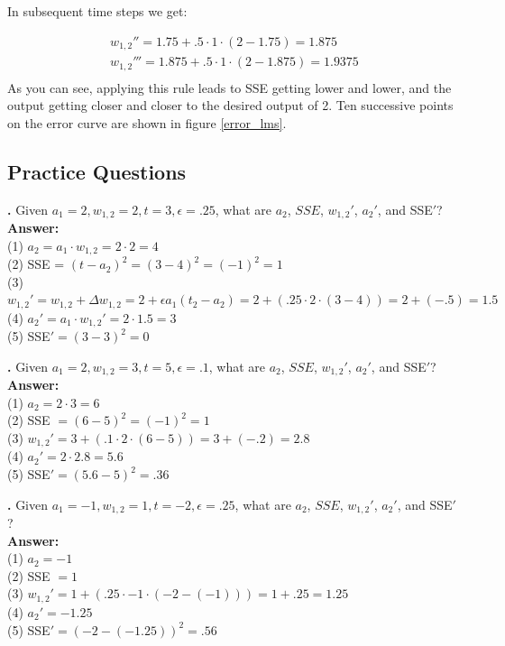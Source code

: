 In subsequent time steps we get:

\begin{eqnarray*}
w_{1,2}'' = 1.75 + .5 \cdot 1 \cdot (2 - 1.75) = 1.875 \\
w_{1,2}''' = 1.875 + .5 \cdot 1 \cdot (2 - 1.875) = 1. 9375 \\
\end{eqnarray*}
As you can see, applying this rule leads to SSE getting lower and lower, and the output getting closer and closer to the desired output of 2. Ten successive points on the error curve are shown in figure \ref{error_lms}.

\subsection{Practice Questions}


\noindent
{}
{\bf \theLMSCounter.}  Given $a_1 = 2 ,w_{1,2} = 2 ,t = 3 ,\epsilon = .25$, what are $a_2$, $SSE$, $w_{1,2}'$, $a_2'$, and SSE$'$? \\
{\bf Answer:}  \\
(1) $a_2 = a_1 \cdot w_{1,2} = 2 \cdot 2 = 4$ \\
(2) SSE = $(t-a_2)^2 = (3-4)^2 = (-1)^2 = 1$ \\
(3) $w_{1,2}' = w_{1,2} + \Delta w_{1,2}  = 2 +  \epsilon a_1 (t_2 - a_2) = 2 + (.25 \cdot 2 \cdot (3 - 4)) = 2+(-.5) = 1.5$\\
(4) $a_2' =  a_1 \cdot w_{1,2}' = 2 \cdot 1.5 = 3$ \\
(5) SSE$' = (3-3)^2 = 0$
\bigskip

\noindent
{}
{\bf \theLMSCounter.}  Given $a_1 = 2 ,w_{1,2} = 3, t = 5 ,\epsilon = .1$, what are $a_2$, $SSE$, $w_{1,2}'$, $a_2'$, and SSE$'$? \\
{\bf Answer:} \\
(1) $a_2 = 2 \cdot 3 = 6$ \\
(2) SSE $= (6-5)^2 = (-1)^2 = 1$ \\
(3) $w_{1,2}' = 3 + (.1 \cdot 2 \cdot (6-5)) = 3 + (-.2) = 2.8$ \\
(4) $a_2' = 2 \cdot 2.8= 5.6$ \\
(5) SSE$' = (5.6-5)^2 = .36$
\bigskip

\noindent
{}
{\bf \theLMSCounter.}  Given $a_1 = -1 ,w_{1,2} = 1, t = -2 ,\epsilon = .25$, what are $a_2$, $SSE$, $w_{1,2}'$, $a_2'$, and SSE$'$? \\
{\bf Answer:} \\
(1) $a_2 = -1$ \\
(2) SSE $= 1$ \\
(3) $w_{1,2}' = 1 + (.25 \cdot -1 \cdot (-2-(-1))) = 1 + .25 = 1.25$ \\
(4) $a_2' = -1.25$ \\
(5) SSE$' = (-2 - (-1.25))^2 = .56$
\bigskip

